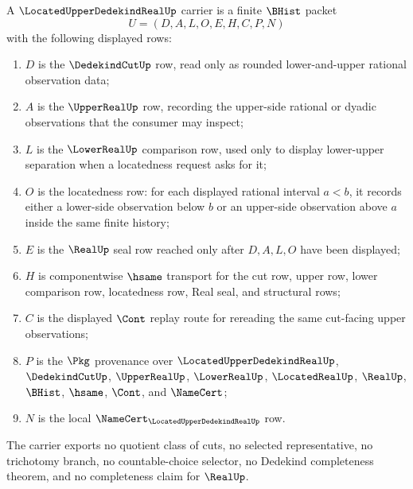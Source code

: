 \begin{definition}
\label{def:located-upper-dedekind-real-carrier}
A $\LocatedUpperDedekindRealUp$ carrier is a finite $\BHist$ packet
$$
U=(D,A,L,O,E,H,C,P,N)
$$
with the following displayed rows:
\begin{enumerate}
\item $D$ is the $\DedekindCutUp$ row, read only as rounded lower-and-upper rational observation data;
\item $A$ is the $\UpperRealUp$ row, recording the upper-side rational or dyadic observations that the consumer may inspect;
\item $L$ is the $\LowerRealUp$ comparison row, used only to display lower-upper separation when a locatedness request asks for it;
\item $O$ is the locatedness row: for each displayed rational interval $a<b$, it records either a lower-side observation below $b$ or an upper-side observation above $a$ inside the same finite history;
\item $E$ is the $\RealUp$ seal row reached only after $D,A,L,O$ have been displayed;
\item $H$ is componentwise $\hsame$ transport for the cut row, upper row, lower comparison row, locatedness row, Real seal, and structural rows;
\item $C$ is the displayed $\Cont$ replay route for rereading the same cut-facing upper observations;
\item $P$ is the $\Pkg$ provenance over $\LocatedUpperDedekindRealUp$, $\DedekindCutUp$, $\UpperRealUp$, $\LowerRealUp$, $\LocatedRealUp$, $\RealUp$, $\BHist$, $\hsame$, $\Cont$, and $\NameCert$;
\item $N$ is the local $\NameCert_{\LocatedUpperDedekindRealUp}$ row.
\end{enumerate}
The carrier exports no quotient class of cuts, no selected representative, no trichotomy branch, no countable-choice selector, no Dedekind completeness theorem, and no completeness claim for $\RealUp$.
\end{definition}


